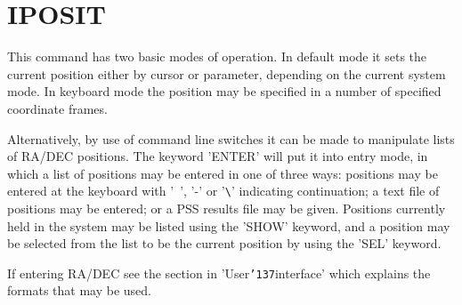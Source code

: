 \documentclass{book}
\renewcommand{\_}{{\tt\char'137}}     %
\begin{document}
\section{IPOSIT}
This command has two basic modes of operation. In default mode it
sets the current position either by cursor or parameter, depending on
the current system mode. In keyboard mode the position may be
specified in a number of specified coordinate frames.

Alternatively, by use of command line switches it can be made to
manipulate lists of RA/DEC positions. The keyword 'ENTER' will
put it into entry mode, in which a list of positions may be
entered in one of three ways: positions may be entered at the
keyboard with '~', '-' or '\verb+\+' indicating continuation; a text
file of positions may be entered; or a PSS results file may be
given. Positions currently held in the system may be listed
using the 'SHOW' keyword, and a position may be selected from
the list to be the current position by using the 'SEL' keyword.

If entering RA/DEC see the section in 'User\_interface' which
explains the formats that may be used.
\end{document}
